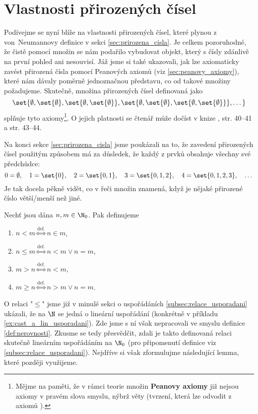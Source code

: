 \section{Vlastnosti přirozených čísel}\label{sec:vlastnosti_prirozenych_cisel}
Podívejme se nyní blíže na vlastnosti přirozených čísel, které plynou z von~Neumannovy definice v sekci \ref{sec:prirozena_cisla}. Je celkem pozoruhodné, že čistě pomocí množin se nám podařilo vybudovat objekt, který s čísly zdánlivě na první pohled ani nesouvisí. Jáž jsme si také ukazovali, jak lze axiomaticky zavést přirozená čísla pomocí Peanových axiomů (viz \ref{sec:peanovy_axiomy}), které nám dávaly poměrně jednoznačnou představu, co od takové množiny požadujeme. Skutečně, množina přirozených čísel definovaná jako
\begin{equation*}
    \set{\emptyset,\set{\emptyset},\set{\emptyset,\set{\emptyset}},\set{\emptyset,\set{\emptyset},\set{\emptyset,\set{\emptyset}}},\dots}
\end{equation*}
splňuje tyto axiomy\footnote{Mějme na paměti, že v rámci teorie množin \textbf{Peanovy axiomy} již nejsou axiomy v pravém slova smyslu, nýbrž věty (tvrzení, která lze odvodit z axiomů \ZF).}. O jejich platnosti se čtenář může dočíst v knize \cite{Goldrei2017}, str. 40--41 a str. 43--44.\par
Na konci sekce \ref{sec:prirozena_cisla} jsme poukázali na to, že zavedení přirozených čísel použitým způsobem má za důsledek, že každý z prvků obsahuje všechny své předchůdce:
\begin{equation*}
    0=\emptyset,\quad 1=\set{0},\quad 2=\set{0,1},\quad 3=\set{0,1,2},\quad 4=\set{0,1,2,3},\quad\dots
\end{equation*}
Je tak docela pěkně vidět, co v řeči množin znamená, když je nějaké přirozené číslo větší/menší než jiné.
\begin{definition}\label{def:nerovnosti}
    Nechť jsou dána $n,m\in\N_0$. Pak definujeme
    \begin{enumerate}[label=(\roman*)]
        \item $n<m\stackrel{\text{def.}}{\iff}n\in m$,
        \item $n\leq m\stackrel{\text{def.}}{\iff}n<m\lor n=m$,
        \item $m>n\stackrel{\text{def.}}{\iff}n<m$,
        \item $m\geq n\stackrel{\text{def.}}{\iff}n>m\lor n=m$.
    \end{enumerate}
\end{definition}
O relaci "$\leq$" jsme již v minulé sekci o uspořádáních \ref{subsec:relace_usporadani} ukázali, že na $\N$ se jedná o lineární uspořádání (konkrétně v příkladu \ref{ex:cast_a_lin_usporadani}). Zde jsme s ní však nepracovali ve smyslu definice \ref{def:nerovnosti}. Zkusme se tedy přesvědčit, zdali je takto definovaná relaci skutečně lineárním uspořádáním na $\N_0$ (pro připomenutí definice viz \ref{subsec:relace_usporadani}). Nejdříve si však zformulujme následující lemma, které později využijeme.
